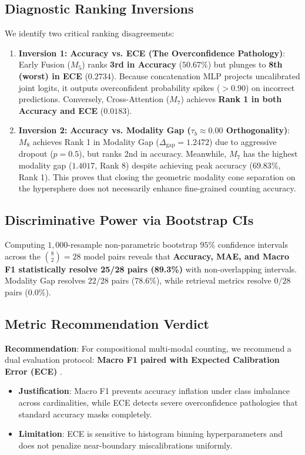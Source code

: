 \documentclass[conference]{IEEEtran}
\begin{document}
\subsection{Diagnostic Ranking Inversions}
We identify two critical ranking disagreements:
\begin{enumerate}
    \item \textbf{Inversion 1: Accuracy vs. ECE (The Overconfidence Pathology)}: Early Fusion ($M_5$) ranks \textbf{3rd in Accuracy} ($50.67\%$) but plunges to \textbf{8th (worst) in ECE} ($0.2734$). Because concatenation MLP projects uncalibrated joint logits, it outputs overconfident probability spikes ($>0.90$) on incorrect predictions. Conversely, Cross-Attention ($M_7$) achieves \textbf{Rank 1 in both Accuracy and ECE} ($0.0183$).
    \item \textbf{Inversion 2: Accuracy vs. Modality Gap ($\tau_b \approx 0.00$ Orthogonality)}: $M_8$ achieves Rank 1 in Modality Gap ($\Delta_{\text{gap}} = 1.2472$) due to aggressive dropout ($p=0.5$), but ranks 2nd in accuracy. Meanwhile, $M_7$ has the highest modality gap ($1.4017$, Rank 8) despite achieving peak accuracy ($69.83\%$, Rank 1). This proves that closing the geometric modality cone separation on the hypersphere does not necessarily enhance fine-grained counting accuracy.
\end{enumerate}

\subsection{Discriminative Power via Bootstrap CIs}
Computing $1,000$-resample non-parametric bootstrap $95\%$ confidence intervals across the $\binom{8}{2} = 28$ model pairs reveals that \textbf{Accuracy, MAE, and Macro F1 statistically resolve 25/28 pairs (89.3\%)} with non-overlapping intervals. Modality Gap resolves $22/28$ pairs ($78.6\%$), while retrieval metrics resolve $0/28$ pairs ($0.0\%$).

\subsection{Metric Recommendation Verdict}
\textbf{Recommendation}: For compositional multi-modal counting, we recommend a dual evaluation protocol: \textbf{Macro F1 paired with Expected Calibration Error (ECE)} \cite{guo2017calibration}. 
\begin{itemize}
    \item \textbf{Justification}: Macro F1 prevents accuracy inflation under class imbalance across cardinalities, while ECE detects severe overconfidence pathologies that standard accuracy masks completely.
    \item \textbf{Limitation}: ECE is sensitive to histogram binning hyperparameters and does not penalize near-boundary miscalibrations uniformly.
\end{itemize}
\end{document}
